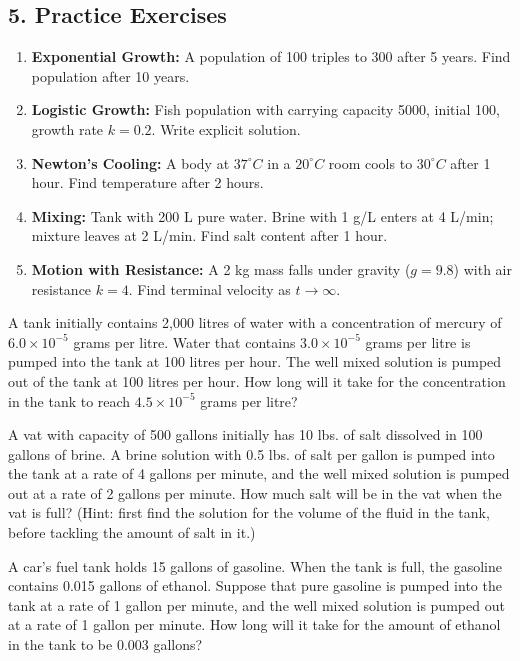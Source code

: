 \subsection*{5. Practice Exercises}
\begin{enumerate}
    \item \textbf{Exponential Growth:} A population of 100 triples to 300 after 5 years. Find population after 10 years.
    \item \textbf{Logistic Growth:} Fish population with carrying capacity 5000, initial 100, growth rate $k=0.2$. Write explicit solution.
    \item \textbf{Newton's Cooling:} A body at $37^\circ C$ in a $20^\circ C$ room cools to $30^\circ C$ after 1 hour. Find temperature after 2 hours.
    \item \textbf{Mixing:} Tank with 200 L pure water. Brine with 1 g/L enters at 4 L/min; mixture leaves at 2 L/min. Find salt content after 1 hour.
    \item \textbf{Motion with Resistance:} A 2 kg mass falls under gravity ($g=9.8$) with air resistance $k=4$. Find terminal velocity as $t\to\infty$.
\end{enumerate}

\begin{question}
 A tank initially contains 2,000 litres of water with a concentration of mercury of $6.0\times10^{-5}$ grams
per litre. Water that contains $3.0\times 10^{-5}$ grams per litre is pumped into the tank at 100 litres per
hour. The well mixed solution is pumped out of the tank at 100 litres per hour. How long will it
take for the concentration in the tank to reach $4.5\times 10^{-5}$ grams per litre?
\solspace{0.5in}
\end{question}

\begin{question}
A vat with capacity of 500 gallons initially has 10 lbs. of salt dissolved in 100 gallons of brine. A
brine solution with 0.5 lbs. of salt per gallon is pumped into the tank at a rate of 4 gallons per
minute, and the well mixed solution is pumped out at a rate of 2 gallons per minute. How much
salt will be in the vat when the vat is full? (Hint: first find the solution for the volume of the fluid in the tank, before tackling the amount of salt in it.)
\solspace{0.5in}
\end{question}

\begin{question}
A car's fuel tank holds 15 gallons of gasoline. When the tank is full, the gasoline contains 0.015 gallons of ethanol. 
Suppose that pure gasoline is pumped into the tank at a rate of 1 gallon per minute, and the well mixed solution is 
pumped out at a rate of 1 gallon per minute. How long will it take for the amount of ethanol in the tank to be 0.003 gallons?
\solspace{0.5in}
\end{question}


